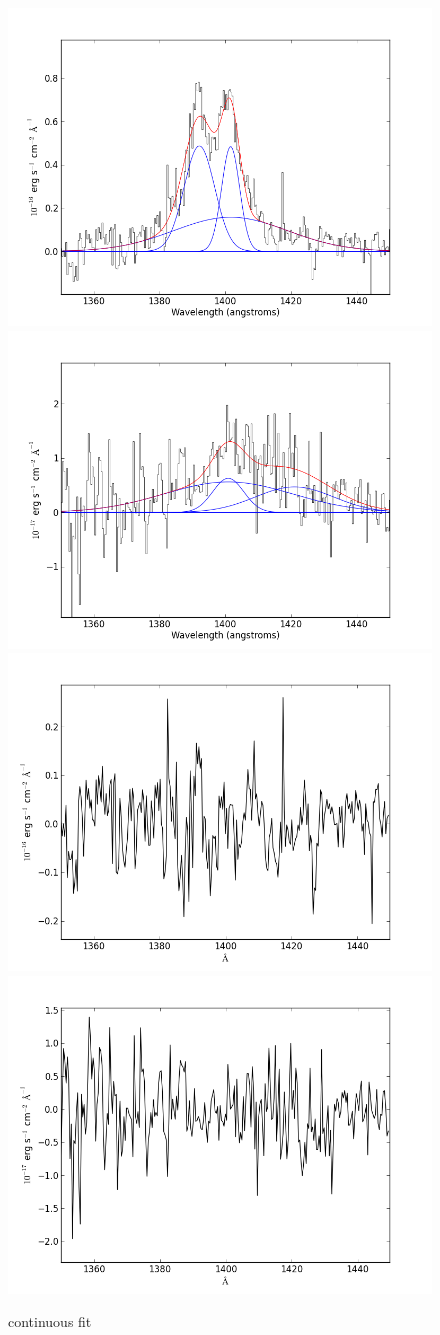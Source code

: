 \documentclass[usenatbib]{mn2e}
\begin{document}
\newpage


\begin{figure}
\begin{center}
\includegraphics[width=0.46\linewidth,angle=0]{SiIV_10.png}
\vspace{5mm}
\includegraphics[width=0.49\linewidth,angle=0]{SiIV_11.png}\\
\includegraphics[width=0.46\linewidth,angle=0]{SiIV_res_10.png}
\hspace{5mm}
\includegraphics[width=0.49\linewidth,angle=0]{SiIV_res_11.png}\\
\end{center} 
\caption{continuous fit \label{fig:landscape}}   
\end{figure}
\end{document}
